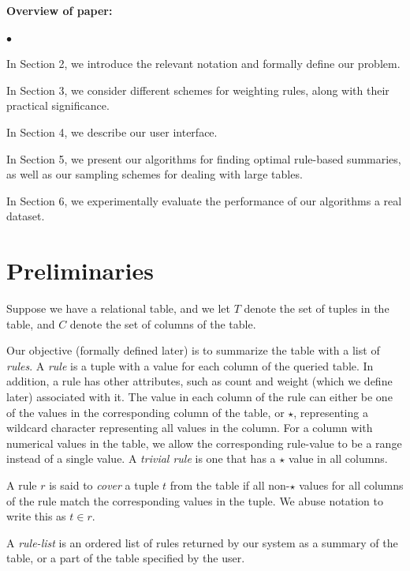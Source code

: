 \documentclass{sig-alternate}
\newcounter{prob}
\newcommand{\squishlist}{
   \begin{list}{$\bullet$}
    { \setlength{\itemsep}{0pt}
      \setlength{\parsep}{2pt}
      \setlength{\topsep}{2pt}
      \setlength{\partopsep}{0pt}
    }
}
\newcommand{\stitle}[1]{\vspace{0.5em}\noindent\textbf{#1}}
\newcommand{\squishend}{\end{list}}
\begin{document}
\stitle{Overview of paper:} 
\squishlist 

\item In Section 2, we introduce the relevant notation and formally define our problem.

\item In Section 3, we consider different schemes for weighting rules, along with their practical significance.

\item In Section 4, we describe our user interface. 
  
\item In Section 5, we present our algorithms for finding optimal rule-based summaries, as well as our sampling schemes for dealing with large tables.

\item In Section 6, we experimentally evaluate the performance of our algorithms a real dataset.
\squishend 

\section{Preliminaries} 
\label{sec:preliminaries}
Suppose we have a relational table, and we let $T$ denote the set of tuples in the table, and $C$ denote the set of columns of the table. 

Our objective (formally defined later) is to summarize the table with a list of {\em rules}. A {\em rule} is a tuple with a value for each column of the queried table. In addition, a rule has other attributes, such as count and weight (which we define later) associated with it. The value in each column of the rule can either be one of the values in the corresponding column of the table, or $\star$, representing a wildcard character representing all values in the column. For a column with numerical values in the table, we allow the corresponding rule-value to be a range instead of a single value. A {\em trivial rule} is one that has a $\star$ value in all columns. 

A rule $r$ is said to {\em cover} a tuple  $t$ from the table if all non-$\star$ values for all columns of the rule match the corresponding values in the tuple. We abuse notation to write this as $t \in r$.

A {\em rule-list} is an ordered list of rules returned by our system as a summary of the table, or a part of the table specified by the user. 
\end{document}
